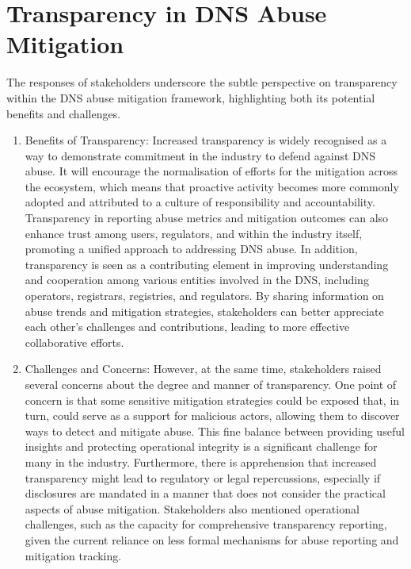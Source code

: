 \section{Transparency in DNS Abuse Mitigation} 

The responses of stakeholders underscore the subtle perspective on transparency within the DNS abuse mitigation framework, highlighting both its potential benefits and challenges.

\begin{enumerate}
    \item Benefits of Transparency: Increased transparency is widely recognised as a way to demonstrate commitment in the industry to defend against DNS abuse. It will encourage the normalisation of efforts for the mitigation across the ecosystem, which means that proactive activity becomes more commonly adopted and attributed to a culture of responsibility and accountability. Transparency in reporting abuse metrics and mitigation outcomes can also enhance trust among users, regulators, and within the industry itself, promoting a unified approach to addressing DNS abuse. In addition, transparency is seen as a contributing element in improving understanding and cooperation among various entities involved in the DNS, including operators, registrars, registries, and regulators. By sharing information on abuse trends and mitigation strategies, stakeholders can better appreciate each other's challenges and contributions, leading to more effective collaborative efforts.

    \item Challenges and Concerns: However, at the same time, stakeholders raised several concerns about the degree and manner of transparency. One point of concern is that some sensitive mitigation strategies could be exposed that, in turn, could serve as a support for malicious actors, allowing them to discover ways to detect and mitigate abuse. This fine balance between providing useful insights and protecting operational integrity is a significant challenge for many in the industry. Furthermore, there is apprehension that increased transparency might lead to regulatory or legal repercussions, especially if disclosures are mandated in a manner that does not consider the practical aspects of abuse mitigation. Stakeholders also mentioned operational challenges, such as the capacity for comprehensive transparency reporting, given the current reliance on less formal mechanisms for abuse reporting and mitigation tracking.
    

\end{enumerate}
